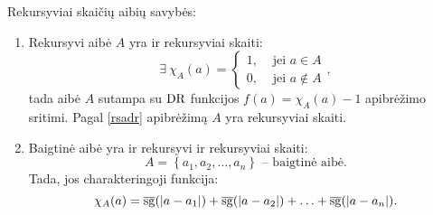 Rekursyviai skaičių aibių savybės:
\begin{enumerate}
  \item Rekursyvi aibė $A$ yra ir rekursyviai skaiti:
    \[
    \exists \: \chi_{A}(a) =%
    \begin{cases}
      1, & \text{ jei } a \in A \\
      0, & \text{ jei } a \not \in A
    \end{cases},
    \]
    tada aibė $A$ sutampa su $\mathop{\text{DR}}$ funkcijos $f(a) = \chi_{A}(a) - 1$
    apibrėžimo sritimi. Pagal \ref{rsadr} apibrėžimą $A$ yra 
    rekursyviai skaiti.
  \item Baigtinė aibė yra ir rekursyvi ir rekursyviai skaiti:
    \[
    A = \left\{ a_1, a_2, \dotsc, a_n \right\} \text{ – baigtinė aibė.}
    \]
    Tada, jos charakteringoji funkcija:
    \[
    \chi_{A}(a) = \sgi(|a - a_1|) + \sgi(|a - a_2|) + \dotsc +%
      \sgi(|a - a_n|).
    \]
\end{enumerate}


